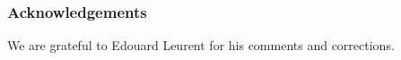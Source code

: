 \documentclass[a4paper, 10pt, conference]{ieeeconf}      %
\begin{document}
\subsubsection*{Acknowledgements} We are grateful to Edouard Leurent for his comments and corrections.












%
\end{document}
